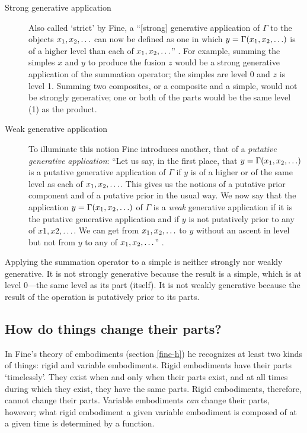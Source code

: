 \documentclass[11pt]{article}
\begin{document}
\begin{spacing}{1.5}
\begin{description}
  \item[Strong generative application] Also called `strict' by Fine, a
    ``[strong] generative application of $\Gamma$ to the objects $x_1,
    x_2, \mathellipsis$ can now be defined as one in which $y = \Gamma
    (x_1, x_2, \mathellipsis )$ is of a higher level than each of
    $x_1, x_2, \mathellipsis$'' \citeyearpar[584]{fine2010}.  For
    example, summing the simples $x$ and $y$ to produce the fusion $z$
    would be a strong generative application of the summation
    operator; the simples are level 0 and $z$ is level 1.  Summing two
    composites, or a composite and a simple, would not be strongly
    generative; one or both of the parts would be the same level (1)
    as the product.
  \item[Weak generative application] To illuminate this notion Fine
    introduces another, that of a {\em putative generative
      application}: ``Let us say, in the first place, that $y = \Gamma
    (x_1, x_2, \mathellipsis )$ is a putative generative application
    of $\Gamma$ if $y$ is of a higher or of the same level as each of
    $x_1, x_2, \mathellipsis$.  This gives us the notions of a
    putative prior component and of a putative prior in the usual way.
    We now say that the application $y = \Gamma (x_1, x_2,
    \mathellipsis )$ of $\Gamma$ is a {\em weak} generative
    application if it is the putative generative application and if
    $y$ is not putatively prior to any of $x1, x2, \mathellipsis$.  We
    can get from $x_1, x_2, \mathellipsis$ to $y$ without an ascent in
    level but not from $y$ to any of $x_1, x_2, \mathellipsis$''
    \citeyearpar[584]{fine2010}.
\end{description}

Applying the summation operator to a simple is neither strongly nor
weakly generative.  It is not strongly generative because the result
is a simple, which is at level 0---the same level as its part
(itself).  It is not weakly generative because the result of the
operation is putatively prior to its parts.

\subsection{How do things change their parts?}
\label{c-change}
In Fine's theory of embodiments (section \ref{fine-h}) he recognizes
at least two kinds of things: rigid and variable embodiments.  Rigid
embodiments have their parts `timelessly'.  They exist when and only
when their parts exist, and at all times during which they exist, they
have the same parts.  Rigid embodiments, therefore, cannot change
their parts.  Variable embodiments {\em can} change their parts,
however; what rigid embodiment a given variable embodiment is composed
of at a given time is determined by a function.


\end{spacing}
\end{document}

